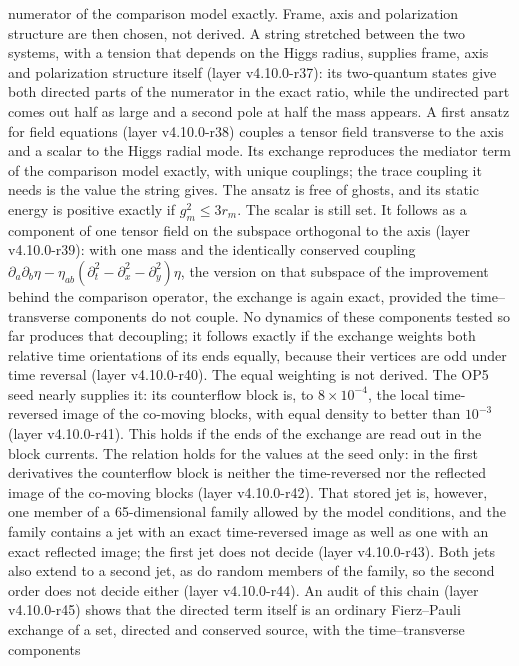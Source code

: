 numerator of the comparison model exactly. Frame, axis and
polarization structure are then chosen, not derived. A string
stretched between the two systems, with a tension that depends on the
Higgs radius, supplies frame, axis and polarization structure itself
(layer v4.10.0-r37): its two-quantum states give both directed parts of
the numerator in the exact ratio, while the undirected part comes out
half as large and a second pole at half the mass appears. A first
ansatz for field equations (layer v4.10.0-r38) couples a tensor field
transverse to the axis and a scalar to the Higgs radial mode. Its
exchange reproduces the mediator term of the comparison model exactly,
with unique couplings; the trace coupling it needs is the value the
string gives. The ansatz is free of ghosts, and its static energy is
positive exactly if \(g_m^2\le3r_m\). The scalar is still set. It
follows as a component of one tensor field on the subspace orthogonal
to the axis (layer v4.10.0-r39): with one mass and the identically
conserved coupling \(\partial_a\partial_b\eta-\eta_{ab}(\partial_t^2-\partial_x^2-\partial_y^2)\eta\), the version on that
subspace of the improvement behind the comparison operator, the
exchange is again exact, provided the time--transverse components do
not couple.  No dynamics of these components tested so far produces that
decoupling; it follows exactly if the exchange weights both relative
time orientations of its ends equally, because their vertices are odd
under time reversal (layer v4.10.0-r40).  The equal weighting is not
derived.  The OP5 seed nearly supplies it: its counterflow block is, to
\(8\times10^{-4}\), the local time-reversed image of the co-moving blocks, with
equal density to better than \(10^{-3}\) (layer v4.10.0-r41).  This holds if
the ends of the exchange are read out in the block currents.  The
relation holds for the values at the seed only: in the first derivatives
the counterflow block is neither the time-reversed nor the reflected
image of the co-moving blocks (layer v4.10.0-r42).  That stored jet is,
however, one member of a 65-dimensional family allowed by the model
conditions, and the family contains a jet with an exact time-reversed
image as well as one with an exact reflected image; the first jet does
not decide (layer v4.10.0-r43).  Both jets also extend to a second jet,
as do random members of the family, so the second order does not decide
either (layer v4.10.0-r44).  An audit of this chain (layer v4.10.0-r45)
shows that the directed term itself is an ordinary Fierz--Pauli exchange of
a set, directed and conserved source, with the time--transverse components
